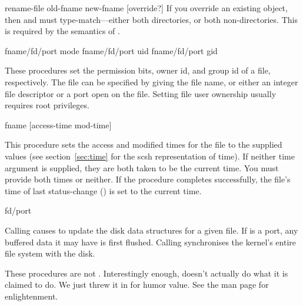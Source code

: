 \begin{defundescx} {rename-file} {old-fname new-fname [override?]} \undefined
    If you override an existing object, then  
    and  must type-match---either both directories, 
    or both non-directories. 
    This is required by the semantics of {\Unix} .

\end{defundescx}
    
  {fname/fd/port mode} \undefined
{} {fname/fd/port uid}  {\undefined}
 {fname/fd/port gid}  {\undefined}
\begin{desc}    
    These procedures set the permission bits, owner id, and group id of a
    file, respectively.
    The file can be specified by giving the file name, or either an
    integer file descriptor or a port open on the file.
    Setting file user ownership usually requires root privileges.
\end{desc}

 {fname [access-time mod-time]} {\undefined}
\begin{desc}
    This procedure sets the access and modified times for the file
     to the supplied values (see section~\ref{sec:time}
    for the scsh representation of time).
    If neither time argument is supplied, they are both taken to be
    the current time. You must provide both times or neither.
    If the procedure completes successfully, the file's time of last
    status-change () is set to the current time.
\end{desc}

 {fd/port} \undefined
{}  \undefined
\begin{desc}
    Calling 
    causes {\Unix} to update the disk data structures for a given file.
    If  is a port, any buffered data it may have is first
    flushed. 
    Calling  synchronises the kernel's entire file
    system with the disk.

    These procedures are not {\Posix}.
    Interestingly enough,  doesn't actually
    do what it is claimed to do. We just threw it in for humor value.
    See the  man page for {\Unix} enlightenment.
\end{desc}

